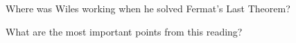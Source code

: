 \documentclass[nooutcomes]{ximera}
\begin{document}
\begin{question}
Where was Wiles working when he solved Fermat's Last Theorem?
\begin{multipleChoice}
\end{multipleChoice}
\end{question}


\begin{question}
What are the most important points from this reading?
\begin{freeResponse}
\end{freeResponse}

\end{question}
\end{document}
